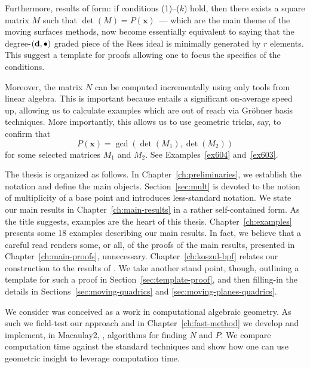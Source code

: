 \documentclass[fleqn,reqno]{amsart}
\begin{document}
Furthermore, results of form:
if conditions (1)--($k$) hold,
then there exists a square matrix $M$ such that $\det(M)=P(\mathbf x)$~---
which are the main theme of the moving surfaces methods,
now become essentially equivalent to saying that the degree-$(\mathbf d,\bullet)$ graded piece
of the Rees ideal is minimally generated by $r$ elements.
This suggest a template for proofs allowing one to focus the specifics of the conditions.

Moreover, the matrix $N$ can be computed incrementally
using only tools from linear algebra.
This is important because entails a significant on-average speed up,
allowing us to calculate examples which are out of reach via Gr\"obner basis techniques.
More importantly, this allows us to use geometric tricks, say,
to confirm that
\[
	P(\mathbf x)=\gcd(\det(M_1),\det(M_2))
\]
for some selected matrices $M_1$ and $M_2$.
See Examples~\ref{ex604} and~\ref{ex603}.

The thesis is organized as follows.
In Chapter~\ref{ch:preliminaries}, we establish the notation and define the main objects.
Section~\ref{sec:mult} is devoted to the notion of multiplicity of a base point and
introduces less-standard notation.
We state our main results in Chapter~\ref{ch:main-results} in a rather self-contained form.
As the title suggests, examples are the heart of this thesis.
Chapter~\ref{ch:examples} presents some 18 examples describing our main results.
In fact, we believe that a careful read renders some, or all, of the proofs of the main results,
presented in Chapter~\ref{ch:main-proofs}, unnecessary.
Chapter~\ref{ch:koszul-bpf} relates our construction to the results of \citet{CGZ-00}.
We take another stand point, though, outlining a template for such a proof in
Section~\ref{sec:template-proof},
and then filling-in the details in
Sections~\ref{sec:moving-quadrics} and \ref{sec:moving-planes-quadrics}.

We consider was conceived as a work in computational algebraic geometry.
As such we field-test our approach and in Chapter~\ref{ch:fast-method}
we develop and implement, in Macaulay2, \citet{M2},
algorithms for finding $N$ and $P$.
We compare computation time against the standard techniques and
show how one can use geometric insight to leverage computation time.



\end{document}
